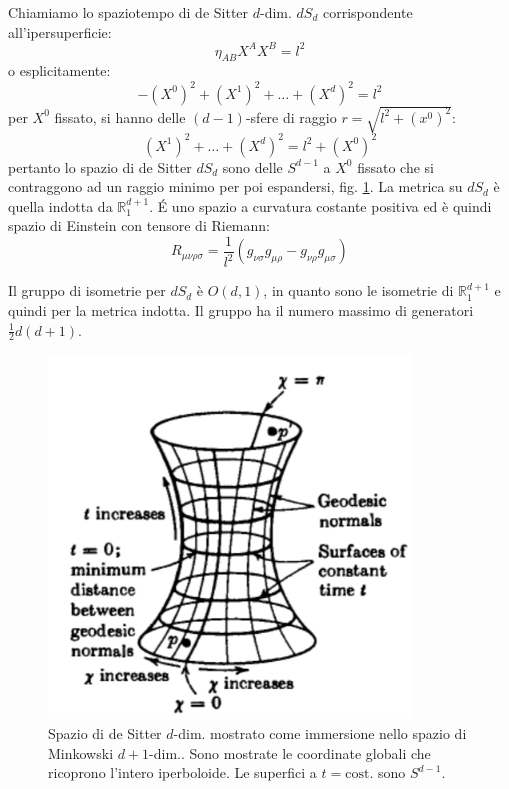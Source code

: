 Chiamiamo lo spaziotempo di de Sitter $d$-dim. $dS_d$ corrispondente all'ipersuperficie:
\begin{equation*}
    \eta_{AB}X^A X^B = l^2
\end{equation*}
o esplicitamente:
\begin{equation*}
    -(X^0)^2 + (X^1)^2 + \dots + (X^d)^2 = l^2
\end{equation*}
per $X^0$ fissato, si hanno delle $(d-1)$-sfere di raggio $r = \sqrt{l^2 + (x^0)^2}$:
\begin{equation*}
    (X^1)^2 + \dots + (X^d)^2 = l^2 + (X^0)^2
\end{equation*}
pertanto lo spazio di de Sitter $dS_d$ sono delle $S^{d-1}$ a $X^0$ fissato che si contraggono ad un raggio minimo per poi espandersi, fig. \ref{fig.spazio_desitter}. La metrica su $dS_d$ è quella indotta da $\mathbb{R}^{d+1}_1$.
\'E uno spazio a curvatura costante positiva ed è quindi spazio di Einstein con tensore di Riemann:
\begin{equation*}
    R_{\mu\nu\rho\sigma} = \frac{1}{l^2}( g_{\nu\sigma}g_{\mu\rho}  - g_{\nu\rho}g_{\mu\sigma})
\end{equation*}

Il gruppo di isometrie per $dS_d$ è $O(d,1)$, in quanto sono le isometrie di $\mathbb{R}^{d+1}_1$ e quindi per la metrica indotta. Il gruppo ha il numero massimo di generatori $\frac{1}{2}d(d+1)$.

\begin{figure}
    \centering
    \includegraphics[scale=0.7]{immagini/spazio_desitter_embedding.png}
    \caption{Spazio di de Sitter $d$-dim. mostrato come immersione nello spazio di Minkowski $d+1$-dim.. Sono mostrate le coordinate globali che ricoprono l'intero iperboloide. Le superfici a $t = \textrm{cost.}$ sono $S^{d-1}$. }
    \label{fig.spazio_desitter}
\end{figure}
